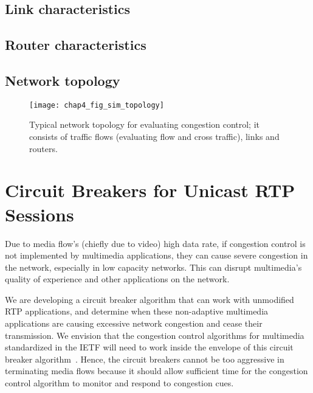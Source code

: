 



\subsection{Link characteristics}

\subsection{Router characteristics}

\subsection{Network topology}

\begin{figure}[!h]
\texttt{[image: chap4\_fig\_sim\_topology]}
\caption{Typical network topology for evaluating congestion control;
		 it consists of traffic flows (evaluating flow and cross 
		 traffic), links and routers.}
\label{fig:4:topology}
\end{figure}


\section{Circuit Breakers for Unicast RTP Sessions}

Due to media flow's (chiefly due to video) high data rate, if congestion
control is not implemented by multimedia applications, they can cause severe
congestion in the network, especially in low capacity networks. This can
disrupt multimedia's quality of experience and other applications on the
network.

We are developing a circuit breaker algorithm that can work with unmodified
RTP applications, and determine when these non-adaptive multimedia
applications are causing excessive network congestion and cease their
transmission.  We envision that the congestion control algorithms for
multimedia standardized in the IETF will need to work inside the envelope of
this circuit breaker algorithm~\cite{draft.rmcat.evaluate}. Hence, the circuit
breakers cannot be too aggressive in terminating media flows because it
should allow sufficient time for the congestion control algorithm  to monitor
and respond to congestion cues.

